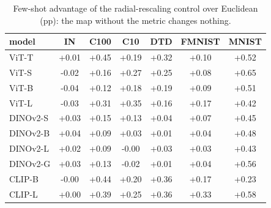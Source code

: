 \begin{table}[H]
\centering
\small
\begin{tabular}{lcccccc}
\toprule
model & IN & C100 & C10 & DTD & FMNIST & MNIST \\
\midrule
ViT-T & +0.01 & +0.45 & +0.19 & +0.32 & +0.10 & +0.52 \\
ViT-S & -0.02 & +0.16 & +0.27 & +0.25 & +0.08 & +0.65 \\
ViT-B & -0.04 & +0.12 & +0.18 & +0.19 & +0.09 & +0.51 \\
ViT-L & -0.03 & +0.31 & +0.35 & +0.16 & +0.17 & +0.42 \\
DINOv2-S & +0.03 & +0.15 & +0.13 & +0.04 & +0.07 & +0.45 \\
DINOv2-B & +0.04 & +0.09 & +0.03 & +0.01 & +0.04 & +0.48 \\
DINOv2-L & +0.02 & +0.09 & -0.00 & +0.03 & +0.03 & +0.43 \\
DINOv2-G & +0.03 & +0.13 & -0.02 & +0.01 & +0.04 & +0.56 \\
CLIP-B & -0.00 & +0.44 & +0.20 & +0.36 & +0.17 & +0.23 \\
CLIP-L & +0.00 & +0.39 & +0.25 & +0.36 & +0.33 & +0.58 \\
\bottomrule
\end{tabular}
\caption{Few-shot advantage of the radial-rescaling control over Euclidean (pp): the map without the metric changes nothing.}
\label{tab:a5}
\end{table}
